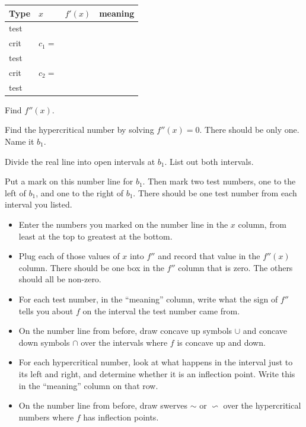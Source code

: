 \begin{ProblemSet}
\begin{Problem}[pencil space=0in]
  \newcommand{\Bx}[1]{\Strut[-0.25in]{0.75in}#1}
  \begin{tabular}{l|p{1in}|p{1in}|p{3in}}
    Type & $x$ & $f'(x)$ & meaning
    \\ \hline
    \Bx{test} & & &
    \\ \hline
    \Bx{crit} & \Bx{$c_1 = $} & &
    \\ \hline
    \Bx{test} & & &
    \\ \hline
    \Bx{crit} & \Bx{$c_2 = $} & &
    \\ \hline
    \Bx{test} & & &
    \\ \hline
  \end{tabular}
 \end{Problem}

 \begin{Problem}
  Find $f''(x)$.
 \end{Problem}
 \begin{Problem}
  Find the hypercritical number by solving $f''(x)=0$.
  There should be only one.
  Name it $b_1$.
 \end{Problem}
 \begin{Problem}
  Divide the real line into open intervals at $b_1$.
  List out both intervals.
 \end{Problem}
 \begin{Problem}[pencil space=0in]
  Put a mark on this number line for $b_1$.
  Then mark two test numbers, one to the left of $b_1$,
  and one to the right of $b_1$.
  There should be one test number from each interval you listed.

  \NumberLine
 \end{Problem}

 \begin{Problem}[pencil space=0in]
  \begin{itemize}
  \item Enter the numbers you marked on the number line in the $x$ column, from least at the top to greatest at the bottom.
  \item Plug each of those values of $x$ into $f''$ and record that value in the $f''(x)$ column.
   There should be one box in the $f''$ column that is zero.
   The others should all be non-zero.
  \item For each test number, in the ``meaning'' column, write what the sign of $f''$ tells you about $f$ on the interval the test number came from.
  \item On the number line from before, draw concave up symbols $\cup$ and concave down symbols $\cap$ over the intervals where $f$ is concave up and down.
  \item For each hypercritical number, look at what happens in the interval just to its left and right, and determine whether it is an inflection point.
   Write this in the ``meaning'' column on that row.
  \item On the number line from before, draw swerves $\sim$ or $\backsim$ over the hypercritical numbers where $f$ has inflection points.
  \end{itemize}
  \bigskip


\end{Problem}
\end{ProblemSet}
